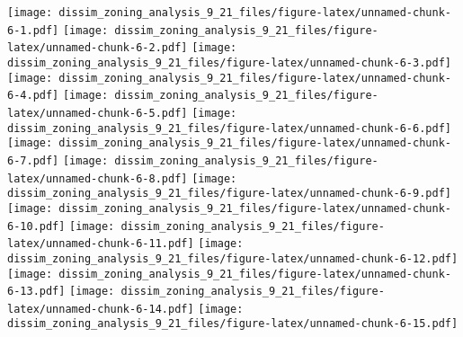 \documentclass[
]{article}
\begin{document}
\texttt{[image: dissim\_zoning\_analysis\_9\_21\_files/figure-latex/unnamed-chunk-6-1.pdf]}
\texttt{[image: dissim\_zoning\_analysis\_9\_21\_files/figure-latex/unnamed-chunk-6-2.pdf]}
\texttt{[image: dissim\_zoning\_analysis\_9\_21\_files/figure-latex/unnamed-chunk-6-3.pdf]}
\texttt{[image: dissim\_zoning\_analysis\_9\_21\_files/figure-latex/unnamed-chunk-6-4.pdf]}
\texttt{[image: dissim\_zoning\_analysis\_9\_21\_files/figure-latex/unnamed-chunk-6-5.pdf]}
\texttt{[image: dissim\_zoning\_analysis\_9\_21\_files/figure-latex/unnamed-chunk-6-6.pdf]}
\texttt{[image: dissim\_zoning\_analysis\_9\_21\_files/figure-latex/unnamed-chunk-6-7.pdf]}
\texttt{[image: dissim\_zoning\_analysis\_9\_21\_files/figure-latex/unnamed-chunk-6-8.pdf]}
\texttt{[image: dissim\_zoning\_analysis\_9\_21\_files/figure-latex/unnamed-chunk-6-9.pdf]}
\texttt{[image: dissim\_zoning\_analysis\_9\_21\_files/figure-latex/unnamed-chunk-6-10.pdf]}
\texttt{[image: dissim\_zoning\_analysis\_9\_21\_files/figure-latex/unnamed-chunk-6-11.pdf]}
\texttt{[image: dissim\_zoning\_analysis\_9\_21\_files/figure-latex/unnamed-chunk-6-12.pdf]}
\texttt{[image: dissim\_zoning\_analysis\_9\_21\_files/figure-latex/unnamed-chunk-6-13.pdf]}
\texttt{[image: dissim\_zoning\_analysis\_9\_21\_files/figure-latex/unnamed-chunk-6-14.pdf]}
\texttt{[image: dissim\_zoning\_analysis\_9\_21\_files/figure-latex/unnamed-chunk-6-15.pdf]}
\end{document}
